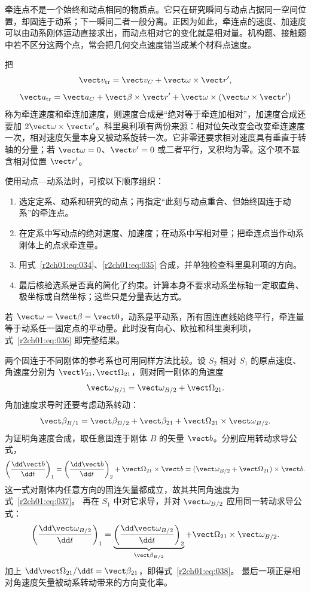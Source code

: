 牵连点不是一个始终和动点相同的物质点。它只在研究瞬间与动点占据同一空间位置，却固连于动系；下一瞬间二者一般分离。正因为如此，牵连点的速度、加速度可以由动系刚体运动直接求出，而动点相对它的变化就是相对量。机构题、接触题中若不区分这两个点，常会把几何交点速度错当成某个材料点速度。

把
\[
  \vect v_{\mathrm{tr}}=\vect v_C+\vect\omega\times\vect r',
\]
\[
  \vect a_{\mathrm{tr}}=\vect a_C+\vect\beta\times\vect r'
  +\vect\omega\times(\vect\omega\times\vect r')
\]
称为牵连速度和牵连加速度，则速度合成是“绝对等于牵连加相对”，加速度合成还要加
$2\vect\omega\times\vect v'$。科里奥利项有两份来源：相对位矢改变会改变牵连速度一次，相对速度矢量本身又被动系旋转一次。它非零还要求相对速度具有垂直于转轴的分量；若 $\vect\omega=0$、$\vect v'=0$ 或二者平行，叉积均为零。这个项不显含相对位置 $\vect r'$。

使用动点—动系法时，可按以下顺序组织：
\begin{enumerate}
  \item 选定定系、动系和研究的动点；再指定“此刻与动点重合、但始终固连于动系”的牵连点。
  \item 在定系中写动点的绝对速度、加速度；在动系中写相对量；把牵连点当作动系刚体上的点求牵连量。
  \item 用式~\eqref{r2ch01:eq:034}、\eqref{r2ch01:eq:035} 合成，并单独检查科里奥利项的方向。
  \item 最后核验选系是否真的简化了约束。计算本身不要求动系坐标轴一定取直角、极坐标或自然坐标；这些只是分量表达方式。
\end{enumerate}

若 $\vect\omega=\vect\beta=\vect0$，动系是平动系，所有固连直线始终平行，牵连量等于动系任一固定点的平动量。此时没有向心、欧拉和科里奥利项，式~\eqref{r2ch01:eq:036} 即完整结果。

两个固连于不同刚体的参考系也可用同样方法比较。设 $S_2$ 相对 $S_1$ 的原点速度、角速度分别为 $\vect V_{21},\vect\Omega_{21}$，则对同一刚体的角速度
\begin{equation}
  \vect\omega_{B/1}=\vect\omega_{B/2}+\vect\Omega_{21}.
  \label{r2ch01:eq:037}
\end{equation}
角加速度求导时还要考虑动系转动：
\begin{equation}
  \vect\beta_{B/1}=\vect\beta_{B/2}+\vect\beta_{21}
  +\vect\Omega_{21}\times\vect\omega_{B/2}.
  \label{r2ch01:eq:038}
\end{equation}
为证明角速度合成，取任意固连于刚体 $B$ 的矢量 $\vect b$。分别应用转动求导公式，
\[
 \left(\frac{\dd\vect b}{\dd t}\right)_1
 =\left(\frac{\dd\vect b}{\dd t}\right)_2+\vect\Omega_{21}\times\vect b
 =(\vect\omega_{B/2}+\vect\Omega_{21})\times\vect b.
\]
这一式对刚体内任意方向的固连矢量都成立，故其共同角速度为式~\eqref{r2ch01:eq:037}。
再在 $S_1$ 中对它求导，并对 $\vect\omega_{B/2}$ 应用同一转动求导公式：
\[
 \left(\frac{\dd\vect\omega_{B/2}}{\dd t}\right)_1
 =\underbrace{\left(\frac{\dd\vect\omega_{B/2}}{\dd t}\right)_2}_{\vect\beta_{B/2}}
  +\vect\Omega_{21}\times\vect\omega_{B/2}.
\]
加上 $\dd\vect\Omega_{21}/\dd t=\vect\beta_{21}$，即得式~\eqref{r2ch01:eq:038}。
最后一项正是相对角速度矢量被动系转动带来的方向变化率。

